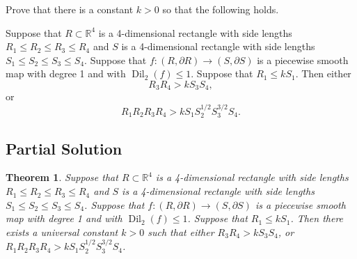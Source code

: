 \documentclass[12pt]{article}
\DeclareMathOperator{\Dil}{Dil}
\newcommand{\RR}{\mathbb{R}}
\newtheorem{theorem}{Theorem}
\begin{document}
Prove that there is a constant $k > 0$ so that the following holds.

Suppose that $R \subset \RR^4$ is a 4-dimensional rectangle with side lengths $R_1 \le R_2 \le R_3 \le R_4$ and $S$ is a 4-dimensional rectangle with side lengths $S_1 \le S_2 \le S_3 \le S_4$. Suppose that $f: (R, \partial R) \rightarrow (S, \partial S)$ is a piecewise smooth map with degree 1 and with $\Dil_2(f) \le 1$. Suppose that $R_1 \le k S_1$. Then either
\[ R_3 R_4 > k S_3 S_4, \]
or 
\[ R_1 R_2 R_3 R_4 > k S_1 S_2^{1/2} S_3^{3/2} S_4. \]

\subsection*{Partial Solution}

\begin{theorem}
Suppose that $R \subset \mathbb{R}^4$ is a 4-dimensional rectangle with side lengths $R_1 \le R_2 \le R_3 \le R_4$ and $S$ is a 4-dimensional rectangle with side lengths $S_1 \le S_2 \le S_3 \le S_4$. Suppose that $f: (R, \partial R) \rightarrow (S, \partial S)$ is a piecewise smooth map with degree 1 and with $\Dil_2(f) \le 1$. Suppose that $R_1 \le k S_1$. Then there exists a universal constant $k > 0$ such that either $R_3 R_4 > k S_3 S_4$, or $R_1 R_2 R_3 R_4 > k S_1 S_2^{1/2} S_3^{3/2} S_4$.
\end{theorem}
\end{document}
